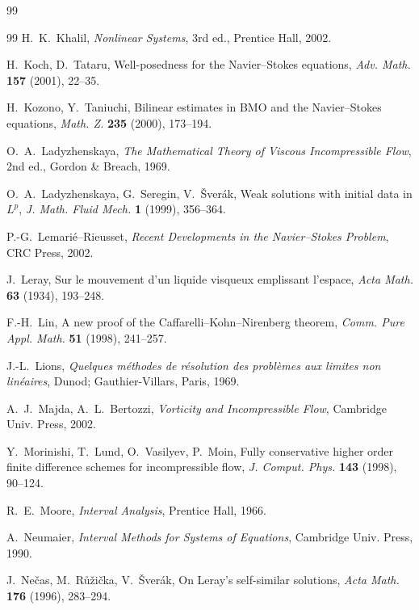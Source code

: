 \IfFileExists{nyjm.cls}{\documentclass[11pt]{nyjm}}{\documentclass[11pt]{amsart}}
\theoremstyle{plain}
\theoremstyle{definition}
\theoremstyle{remark}
\begin{document}
\begin{thebibliography}{99}
\begin{thebibliography}{99}
H.~K.~Khalil,
\emph{Nonlinear Systems}, 3rd ed.,
Prentice Hall, 2002.

H.~Koch, D.~Tataru,
Well-posedness for the Navier--Stokes equations,
\emph{Adv. Math.} \textbf{157} (2001), 22--35.

H.~Kozono, Y.~Taniuchi,
Bilinear estimates in BMO and the Navier--Stokes equations,
\emph{Math. Z.} \textbf{235} (2000), 173--194.

O.~A.~Ladyzhenskaya,
\emph{The Mathematical Theory of Viscous Incompressible Flow}, 2nd ed.,
Gordon \& Breach, 1969.

O.~A.~Ladyzhenskaya, G.~Seregin, V.~\v{S}ver\'ak,
Weak solutions with initial data in $L^p$,
\emph{J. Math. Fluid Mech.} \textbf{1} (1999), 356--364.

P.-G.~Lemari\'e--Rieusset,
\emph{Recent Developments in the Navier--Stokes Problem},
CRC Press, 2002.

J.~Leray,
Sur le mouvement d’un liquide visqueux emplissant l’espace,
\emph{Acta Math.} \textbf{63} (1934), 193--248.

F.-H.~Lin,
A new proof of the Caffarelli--Kohn--Nirenberg theorem,
\emph{Comm. Pure Appl. Math.} \textbf{51} (1998), 241--257.

J.-L.~Lions,
\emph{Quelques m\'ethodes de r\'esolution des probl\`emes aux limites non lin\'eaires},
Dunod; Gauthier-Villars, Paris, 1969.

A.~J.~Majda, A.~L.~Bertozzi,
\emph{Vorticity and Incompressible Flow},
Cambridge Univ. Press, 2002.

Y.~Morinishi, T.~Lund, O.~Vasilyev, P.~Moin,
Fully conservative higher order finite difference schemes for incompressible flow,
\emph{J. Comput. Phys.} \textbf{143} (1998), 90--124.

R.~E.~Moore,
\emph{Interval Analysis},
Prentice Hall, 1966.

A.~Neumaier,
\emph{Interval Methods for Systems of Equations},
Cambridge Univ. Press, 1990.

J.~Ne\v{c}as, M.~R{\r u}\v{z}i\v{c}ka, V.~\v{S}ver\'ak,
On Leray’s self-similar solutions,
\emph{Acta Math.} \textbf{176} (1996), 283--294.


\end{thebibliography}
\end{thebibliography}
\end{document}
